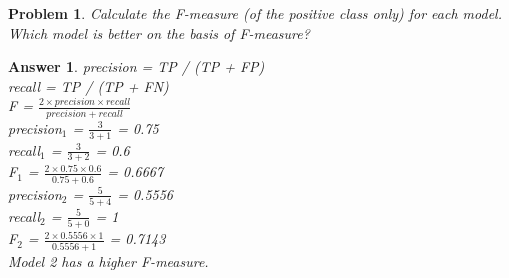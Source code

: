 \documentclass[11pt]{article}
\theoremstyle{description}
\newtheorem{problem}{Problem}
\theoremstyle{break}
\newtheorem*{answer}{Answer}
\begin{document}
    \begin{problem}
        Calculate the F-measure (of the positive class only) for each model.
        Which model is better on the basis of F-measure?
    \end{problem}
    \begin{answer}
        precision = TP / (TP + FP)\\
        recall = TP / (TP + FN)\\
        F = $\frac{2 \times precision \times recall}{precision + recall}$\\
        precision$_1$ = $\frac{3}{3 + 1}$ = 0.75\\
        recall$_1$ = $\frac{3}{3 + 2}$ = 0.6\\
        F$_1$ = $\frac{2 \times 0.75 \times 0.6}{0.75 + 0.6}$ = 0.6667\\
        precision$_2$ = $\frac{5}{5 + 4}$ = 0.5556\\
        recall$_2$ = $\frac{5}{5 + 0}$ = 1\\
        F$_2$ = $\frac{2 \times 0.5556 \times 1}{0.5556 + 1}$ = 0.7143\\
        Model 2 has a higher F-measure.
    \end{answer}
\end{document}
